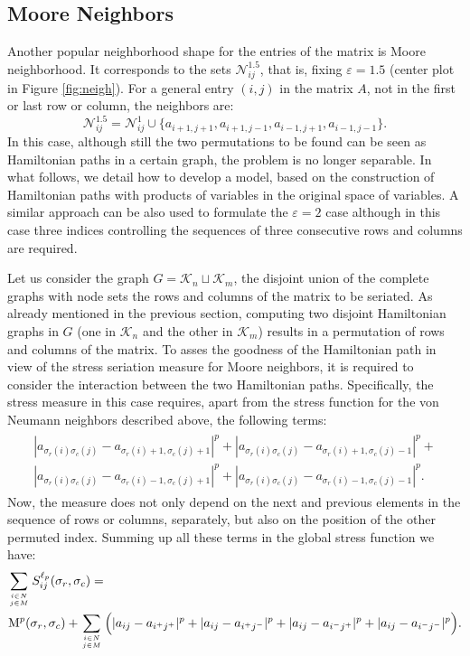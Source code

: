 \documentclass[a4paper,11pt, reqno]{amsart}
\def\N{\mathcal{N}}
\def\K{\mathcal{K}}
\begin{document}
 
\subsection{Moore Neighbors}

Another popular neighborhood shape for the entries of the matrix is Moore neighborhood. It corresponds to the sets $\N_{ij}^{1.5}$, that is, fixing $\varepsilon = 1.5$ (center plot in Figure \ref{fig:neigh}). For a general entry $(i,j)$ in the matrix $A$, not in the first or last row or column,  the neighbors are:
$$
\N_{ij}^{1.5} = \N_{ij}^1 \cup \{a_{i+1,j+1}, a_{i+1,j-1}, a_{i-1,j+1}, a_{i-1,j-1}\}.
$$
In this case, although still the two permutations to be found can be seen as Hamiltonian paths in a certain graph, the problem is no longer separable. In what follows, we detail how to develop a model, based on the construction of Hamiltonian paths with products of variables in the original space of variables. A similar approach can be also used to formulate the $\varepsilon=2$ case although in this case three indices controlling the sequences of three consecutive rows and columns are required.

Let us consider the graph $ G = \K_n \sqcup \K_m$, the disjoint union of the complete graphs with node sets the rows and columns of the matrix to be seriated. As already mentioned in the previous section, computing two disjoint Hamiltonian graphs in $G$ (one in $\K_n$ and the other in $\K_m$) results in a permutation of rows and columns of the matrix. To asses the goodness of the Hamiltonian path in view of the stress seriation measure for Moore neighbors, it is required to consider the interaction between the two Hamiltonian paths. Specifically, the stress measure in this case requires, apart from the stress function for the von Neumann neighbors described above, the following terms:
\begin{eqnarray*}
\begin{split}
|a_{\sigma_r(i)\sigma_c(j)} - a_{\sigma_r(i)+1,\sigma_c(j)+1}|^p + 
|a_{\sigma_r(i)\sigma_c(j)} - a_{\sigma_r(i)+1,\sigma_c(j)-1}|^p + \\ 
|a_{\sigma_r(i)\sigma_c(j)} - a_{\sigma_r(i)-1,\sigma_c(j)+1}|^p +
|a_{\sigma_r(i)\sigma_c(j)} - a_{\sigma_r(i)-1,\sigma_c(j)-1}|^p.
\end{split}
\end{eqnarray*}
Now, the measure does not only depend on the next and previous elements in the sequence of rows or columns, separately, but also on the position of the other permuted index.
Summing up all these terms in the global stress function we have:
\begin{eqnarray*}
&\displaystyle{\sum_{i\in N\atop j \in M} S_{ij}^{\ell_p}(\sigma_r,\sigma_c) =}\\
&\displaystyle{{\rm M}^p(\sigma_r,\sigma_c) + \sum_{i\in N\atop j \in M} \Big(|a_{ij} - a_{i^+j^+}|^p + |a_{ij} - a_{i^+j^-}|^p +|a_{ij} - a_{i^-j^+}|^p +|a_{ij} - a_{i^-j^-}|^p\Big).}
\end{eqnarray*}
\end{document}
